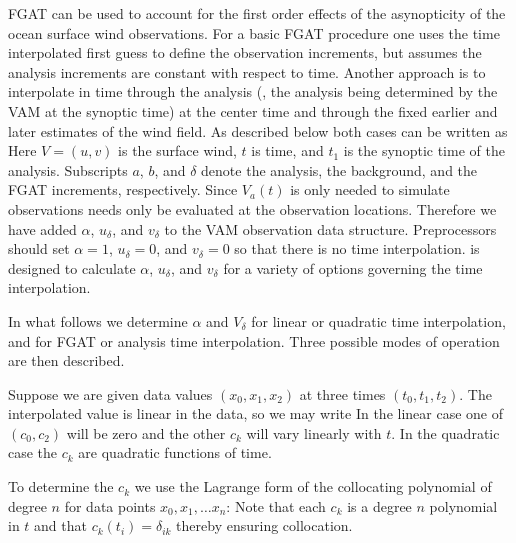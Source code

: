 \documentclass[12pt,titlepage]{article}
\begin{document}

FGAT can be used to account for the first order effects of the
asynopticity of the ocean surface wind observations.
For a basic FGAT procedure one uses the time interpolated first guess
to define the observation increments, but assumes the analysis
increments are constant with respect to time.
Another approach is to interpolate in time through the analysis (\ie,
the analysis being determined by the VAM at the synoptic time) at the
center time and through the fixed earlier and later estimates of the
wind field.
As described below both cases can be written as
Here $V = (u,v)$ is the surface wind, $t$ is time, and $t_1$ is the
synoptic time of the analysis.
Subscripts $a$, $b$, and $\delta$ denote the analysis, the
background, and the FGAT increments, respectively.
Since $V_a(t)$ is only needed to simulate observations 
needs only be evaluated at the observation locations.
Therefore we have added $\alpha$, $u_{\delta}$, and $v_{\delta}$ to
the VAM observation data structure.
Preprocessors should  set  $\alpha=1$, $u_{\delta}=0$, and
$v_{\delta}=0$ so that there is no time interpolation.
 is designed to calculate $\alpha$, $u_{\delta}$, and
$v_{\delta}$ for a variety of options governing the time
interpolation.

In what follows we determine $\alpha$ and $V_{\delta}$ for linear or
quadratic time interpolation, and for FGAT or analysis time
interpolation.
Three possible modes of operation are then described.


Suppose we are given data values $(x_0, x_1, x_2)$ at three times
$(t_0, t_1, t_2)$.
The interpolated value is linear in the data, so we may write
In the linear case one of $(c_0, c_2)$ will be zero and the
other $c_k$ will vary linearly with $t$.
In the quadratic case the $c_k$ are quadratic functions of time.

To determine the $c_k$ we use the Lagrange form of the collocating
polynomial of degree $n$ for data points  $x_0, x_1, \ldots x_n$:
Note that each $c_k$ is a degree $n$ polynomial in $t$ and that
$c_k(t_i) = \delta_{ik}$ thereby ensuring collocation.
\end{document}
